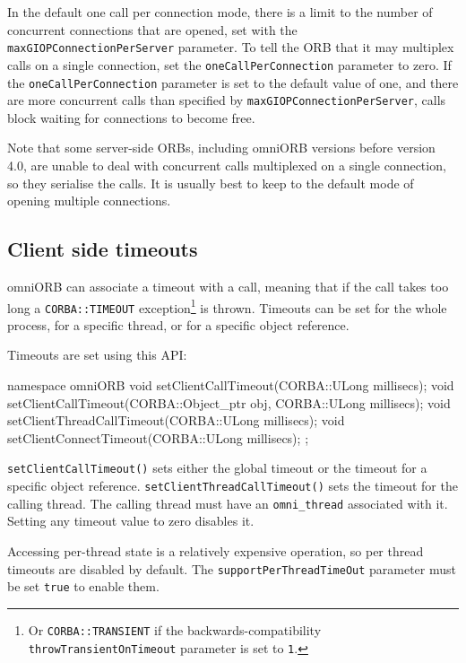 \documentclass[11pt,twoside,a4paper]{book}
\newcommand{\code}[1]{\texttt{#1}}
\newcommand{\op}[1]{\texttt{#1()}}
\newcommand{\dsc}{\discretionary{}{}{}}
\begin{document}
In the default one call per connection mode, there is a limit to the
number of concurrent connections that are opened, set with the
\code{maxGIOPConnection\dsc{}PerServer} parameter. To tell the ORB
that it may multiplex calls on a single connection, set the
\code{oneCallPerConnection} parameter to zero. If the
\code{oneCallPer\dsc{}Connection} parameter is set to the default
value of one, and there are more concurrent calls than specified by
\code{maxGIOPConnectionPerServer}, calls block waiting for connections
to become free.

Note that some server-side ORBs, including omniORB versions before
version 4.0, are unable to deal with concurrent calls multiplexed on a
single connection, so they serialise the calls. It is usually best to
keep to the default mode of opening multiple connections.


\subsection{Client side timeouts}
\label{sec:timeoutAPI}

omniORB can associate a timeout with a call, meaning that if the call
takes too long a \code{CORBA::TIMEOUT} exception\footnote{Or
  \code{CORBA::TRANSIENT} if the backwards-compatibility
  \code{throwTransientOnTimeout} parameter is set to \code{1}.} is
thrown. Timeouts can be set for the whole process, for a specific
thread, or for a specific object reference.

Timeouts are set using this API:

\begin{cxxlisting}
namespace omniORB {
  void setClientCallTimeout(CORBA::ULong millisecs);
  void setClientCallTimeout(CORBA::Object_ptr obj, CORBA::ULong millisecs);
  void setClientThreadCallTimeout(CORBA::ULong millisecs);
  void setClientConnectTimeout(CORBA::ULong millisecs);
};
\end{cxxlisting}

\op{setClientCallTimeout} sets either the global timeout or the
timeout for a specific object reference.
\op{setClientThreadCallTimeout} sets the timeout for the calling
thread. The calling thread must have an \code{omni\_thread} associated
with it. Setting any timeout value to zero disables it.

Accessing per-thread state is a relatively expensive operation, so per
thread timeouts are disabled by default. The
\code{supportPerThreadTimeOut} parameter must be set \code{true} to
enable them.
\end{document}
